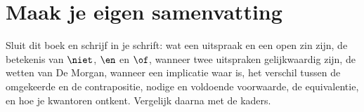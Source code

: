 
\begin{oefeningen}






\end{oefeningen}


\ifzelfstudie
\section*{Maak je eigen samenvatting}
Sluit dit boek en schrijf in je schrift: wat een uitspraak en een open zin zijn, de betekenis van $\niet$, $\en$ en $\of$, wanneer twee uitspraken gelijkwaardig zijn, de wetten van De Morgan, wanneer een implicatie waar is, het verschil tussen de omgekeerde en de contrapositie, nodige en voldoende voorwaarde, de equivalentie, en hoe je kwantoren ontkent. Vergelijk daarna met de kaders.
\fi
